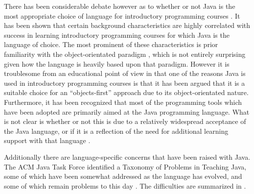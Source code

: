 There has been considerable debate however as to whether or not Java is the most appropriate choice of language for introductory programming courses \cite{Bruce05}.  It has been shown that certain background characteristics are highly correlated with success in learning introductory programming courses for which Java is the language of choice.  The most prominent of these characteristics is prior familiarity with the object-orientated paradigm \cite{Benander04}, which is not entirely surprising given how the language is heavily based upon that paradigm.  However it is troublesome from an educational point of view in that one of the reasons Java is used in introductory programming courses is that it has been argued that it is a suitable choice for an ``objects-first'' approach due to its object-orientated nature.  Furthermore, it has been recognized that most of the programming tools which have been adopted are primarily aimed at the Java programming language.  What is not clear is whether or not this is due to a relatively widespread acceptance of the Java language, or if it is a reflection of the need for additional learning support with that language \cite{Pears07}.

Additionally there are language-specific concerns that have been raised with Java.  The ACM Java Task Force identified a Taxonomy of Problems in Teaching Java, some of which have been somewhat addressed as the language has evolved, and some of which remain problems to this day \cite{acmJavaForce04}.  The difficulties are summarized in .

